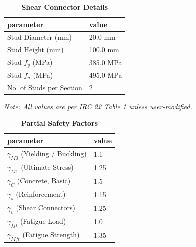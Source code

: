 \documentclass[12pt,a4paper]{report}
\numberwithin{table}{chapter}
\numberwithin{figure}{chapter}
\begin{document}
\label{subsec:shear-connectors}

\vspace{2.2em}

\vspace{0.4em}
\begin{longtable}{|L{5.5cm}|p{10.0cm}|}
\caption{\textbf{Shear Connector Details}}
\\
\hline
\textbf{parameter} & \textbf{value} \\
\hline
\textnormal{Stud Diameter (mm)} & 20.0 mm \\[6pt]
\hline
\textnormal{Stud Height (mm)} & 100.0 mm \\[6pt]
\hline
\textnormal{Stud $f_y$ (MPa)} & 385.0 MPa \\[6pt]
\hline
\textnormal{Stud $f_u$ (MPa)} & 495.0 MPa \\[6pt]
\hline
\textnormal{No. of Studs per Section} & 2 \\[6pt]
\hline
\end{longtable}



\label{subsec:safety-factors}

\vspace{2.2em}

\vspace{0.3em}
\noindent\textit{Note: All values are per IRC 22 Table 1 unless user-modified.}

\vspace{0.4em}
\begin{longtable}{|L{5.5cm}|p{10.0cm}|}
\caption{\textbf{Partial Safety Factors}}
\\
\hline
\textbf{parameter} & \textbf{value} \\
\hline
\textnormal{$\gamma_{M0}$ (Yielding / Buckling)} & 1.1 \\[6pt]
\hline
\textnormal{$\gamma_{M1}$ (Ultimate Stress)} & 1.25 \\[6pt]
\hline
\textnormal{$\gamma_C$ (Concrete, Basic)} & 1.5 \\[6pt]
\hline
\textnormal{$\gamma_s$ (Reinforcement)} & 1.15 \\[6pt]
\hline
\textnormal{$\gamma_v$ (Shear Connectors)} & 1.25 \\[6pt]
\hline
\textnormal{$\gamma_{fft}$ (Fatigue Load)} & 1.0 \\[6pt]
\hline
\textnormal{$\gamma_{Mft}$ (Fatigue Strength)} & 1.35 \\[6pt]
\hline
\end{longtable}
\end{document}
